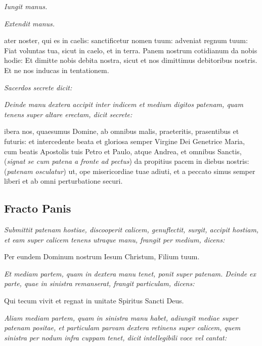 \textit{Iungit manus.}


\textit{Extendit manus.}

ater noster, qui es in caelis: sanctificetur nomen tuum: adveniat
regnum tuum: Fiat voluntas tua, sicut in caelo, et in terra.  Panem nostrum
cotidianum da nobis hodie: Et dimitte nobis debita nostra, sicut et nos
dimittimus debitoribus nostris.  Et ne nos inducas in tentationem.


\textit{Sacerdos secrete dicit:}


\textit{%
    Deinde manu dextera accipit inter indicem et medium digitos patenam, quam
    tenens super altare erectam, dicit secrete:
}

ibera nos, quaesumus Domine, ab omnibus malis, praeteritis,
prasentibus et futuris: et intercedente beata et gloriosa semper Virgine Dei
Genetrice Maria, cum beatis Apostolis tuis Petro et Paulo, atque Andrea, et
omnibus Sanctis, (\textit{signat se cum patena a fronte ad pectus}) da propitius
pacem in diebus nostris: (\textit{patenam osculatur}) ut, ope misericordiae tuae
adiuti, et a peccato simus semper liberi et ab omni perturbatione securi.

\subsection{Fracto Panis}

\textit{%
    Submittit patenam hostiae, discooperit calicem, genuflectit, surgit, accipit
    hostiam, et eam super calicem tenens utraque manu, frangit per medium,
    dicens:
}

{\Large\centering Per eundem Dominum nostrum Iesum Christum, Filium tuum.\par}

\textit{%
    Et mediam partem, quam in dextera manu tenet, ponit super patenam.  Deinde
    ex parte, quae in sinistra remanserat, frangit particulam, dicens:
}

{
    \Large\centering
    Qui tecum vivit et regnat in unitate Spiritus Sancti Deus.
    \par
}

\textit{%
    Aliam mediam partem, quam in sinistra manu habet, adiungit mediae super
    patenam positae, et particulam parvam dextera retinens super calicem, quem
    sinistra per nodum infra cuppam tenet, dicit intellegibili voce vel cantat:
}

